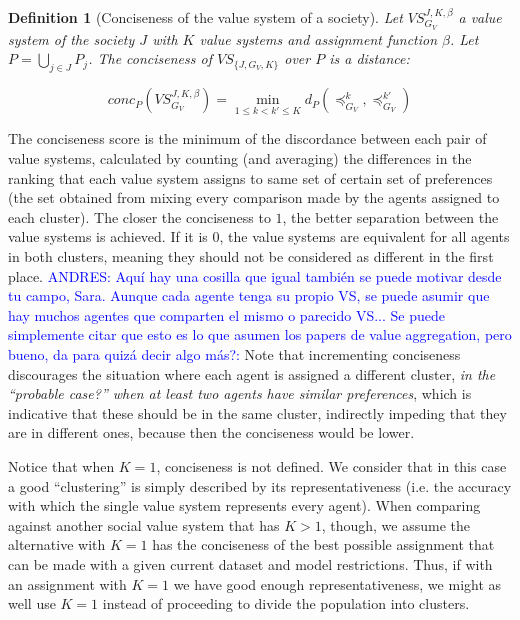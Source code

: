 \documentclass{ecai}
\newtheorem{definition}{Definition}
\begin{document}
\begin{definition}[Conciseness of the value system of a society]
Let $VS_{G_V}^{J,K,\beta}$ a value system of the society $J$ with $K$ value systems and assignment function $\beta$. Let $P = \bigcup_{j\in J}P_j$. The conciseness of $VS_{\{J, G_V,K\}}$ over $P$ is a distance:

    $$conc_P\left(VS_{G_V}^{J,K,\beta}\right) = \min_{1\leq k<k'\leq K} d_{P}(\preccurlyeq_{G_V}^{k}, \preccurlyeq_{G_V}^{k'}) $$


\end{definition}

The conciseness score is the minimum of the discordance between each pair of value systems, calculated by counting (and averaging) the differences in the ranking that each value system assigns to same set of certain set of preferences (the set obtained from mixing every comparison made by the agents assigned to each cluster). The closer the conciseness to $1$, the better separation between the value systems is achieved. If it is $0$, the value systems are equivalent for all agents in both clusters, meaning they should not be considered as different in the first place. \textcolor{blue}{ANDRES: Aquí hay una cosilla que igual también se puede motivar desde tu campo, Sara. Aunque cada agente tenga su propio VS, se puede asumir que hay muchos agentes que comparten el mismo o parecido VS... Se puede simplemente citar que esto es lo que asumen los papers de value aggregation, pero bueno, da para quizá decir algo más?:} Note that incrementing conciseness discourages the situation where each agent is assigned a different cluster, \textit{in the ``probable case?'' when at least two agents have similar preferences}, which is indicative that these should be in the same cluster, indirectly impeding that they are in different ones, because then the conciseness would be lower.

Notice that when $K = 1$, conciseness is not defined. We consider that in this case a good ``clustering'' is simply described by its representativeness (i.e. the accuracy with which the single value system represents every agent). When comparing against another social value system that has $K > 1$, though, we assume the alternative with $K=1$ has the conciseness of the best possible assignment that can be made with a given current dataset and model restrictions. Thus, if with an assignment with $K=1$ we have good enough representativeness, we might as well use $K=1$ instead of proceeding to divide the population into clusters.
\end{document}

